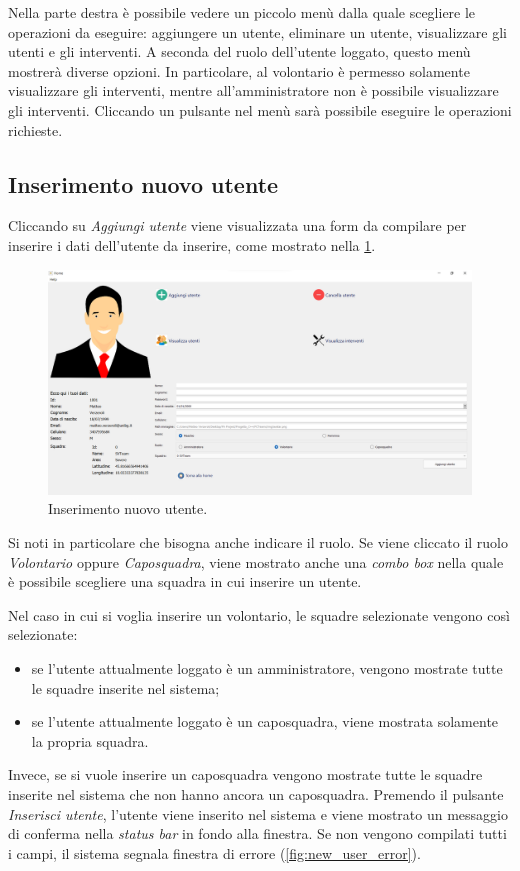 Nella parte destra è possibile vedere un piccolo menù dalla quale scegliere le operazioni da eseguire: aggiungere un utente, eliminare un utente, visualizzare gli utenti e gli interventi. A seconda del ruolo dell'utente loggato, questo menù mostrerà diverse opzioni. In particolare, al volontario è permesso solamente visualizzare gli interventi, mentre all'amministratore non è possibile visualizzare gli interventi. Cliccando un pulsante nel menù sarà possibile eseguire le operazioni richieste.

\subsection{Inserimento nuovo utente}
Cliccando su \textit{Aggiungi utente} viene visualizzata una form da compilare per inserire i dati dell'utente da inserire, come mostrato nella \Fig\ref{fig:new_user}. 
\begin{figure}[h!]
	\centering
	\includegraphics[width=1\linewidth]{./ImageFiles/new_user}
	\caption{Inserimento nuovo utente.}
	\label{fig:new_user}
\end{figure}

Si noti in particolare che bisogna anche indicare il ruolo. Se viene cliccato il ruolo \textit{Volontario} oppure \textit{Caposquadra}, viene mostrato anche una \textit{combo box} nella quale è possibile scegliere una squadra in cui inserire un utente.

Nel caso in cui si voglia inserire un volontario, le squadre selezionate vengono così selezionate: 
\begin{itemize}
	\item se l'utente attualmente loggato è un amministratore, vengono mostrate tutte le squadre inserite nel sistema;
	\item se l'utente attualmente loggato è un caposquadra, viene mostrata solamente la propria squadra.
\end{itemize}
Invece, se si vuole inserire un caposquadra vengono mostrate tutte le squadre inserite nel sistema che non hanno ancora un caposquadra.
Premendo il pulsante \textit{Inserisci utente}, l'utente viene inserito nel sistema e viene mostrato un messaggio di conferma nella \textit{status bar} in fondo alla finestra. Se non vengono compilati tutti i campi, il sistema segnala finestra di errore (\Fig\ref{fig:new_user_error}). 

